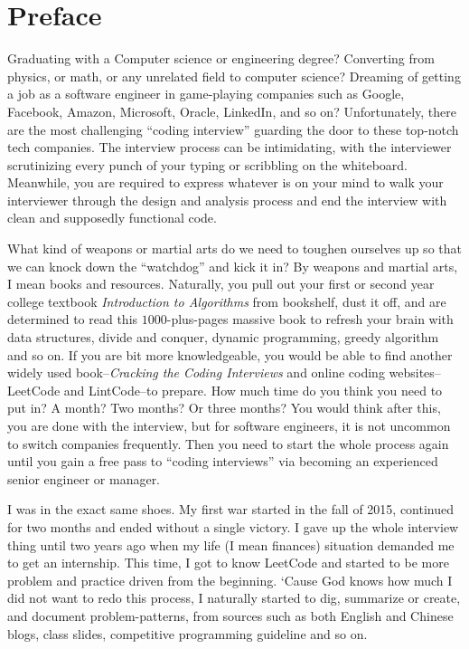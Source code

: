 \documentclass[../main.tex]{subfiles}
\begin{document}
\chapter*{Preface}
Graduating with a Computer science or engineering degree? Converting from physics, or math, or any unrelated field to computer science? Dreaming of getting a job as a software engineer in game-playing companies such as Google, Facebook, Amazon, Microsoft, Oracle, LinkedIn, and so on? Unfortunately, there are the most challenging ``coding interview'' guarding the door to these top-notch tech companies. The interview process can be intimidating,  with the interviewer scrutinizing every punch of your typing or scribbling on the whiteboard. Meanwhile, you are required to express whatever is on your mind to walk your  interviewer through the design and analysis process and end the interview with clean and supposedly functional code. %

What kind of weapons or martial arts do we need to toughen ourselves up so that we can knock down the ``watchdog'' and  kick it in? By weapons and martial arts, I mean books and resources. Naturally, you pull out your first or second year college textbook \textit{Introduction to Algorithms} from bookshelf, dust it off, and are determined to read this $1000$-plus-pages massive book to refresh your brain with data structures, divide and conquer, dynamic programming, greedy algorithm and so on. If you are bit more knowledgeable, you would be able to find another widely used book--\textit{Cracking the Coding Interviews} and online coding websites--LeetCode and LintCode--to prepare. How much time do you think you need to put in? A month? Two months? Or three months? You would think after this, you are done with the interview, but for software engineers, it is not uncommon to switch companies frequently. Then you need to start the whole process again until you gain a free pass to ``coding interviews'' via becoming an experienced senior engineer or manager.  %

I was in the exact same shoes. My first war started in the fall of 2015, continued for two months and ended  without a single victory.  I gave up the whole interview thing until two years ago when my life (I mean finances) situation demanded me to get an internship. This time, I got to know LeetCode and started to be more problem and practice driven from the beginning. `Cause God knows how much I did not want to redo this process, I naturally started to dig, summarize or create, and document problem-patterns, from sources such as both English and Chinese blogs, class slides,  competitive programming guideline and so on. 
\end{document}
